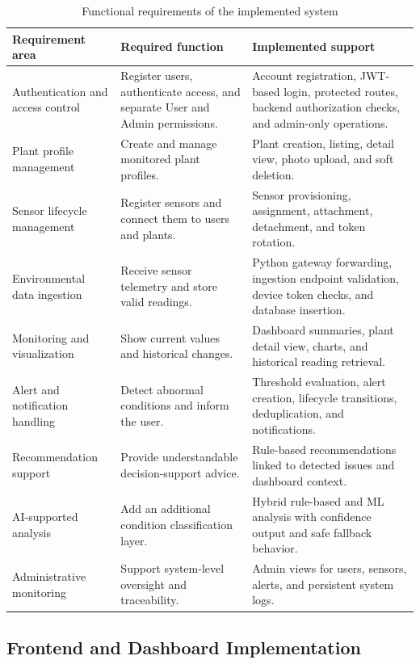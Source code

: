 \begin{table}[H]
\centering
\caption{Functional requirements of the implemented system}
\label{tab:functional-requirements}
\begin{tabular}{p{}p{}p{}}
\hline
\textbf{Requirement area} & \textbf{Required function} & \textbf{Implemented support} \\
\hline
Authentication and access control & Register users, authenticate access, and separate User and Admin permissions. & Account registration, JWT-based login, protected routes, backend authorization checks, and admin-only operations. \\
Plant profile management & Create and manage monitored plant profiles. & Plant creation, listing, detail view, photo upload, and soft deletion. \\
Sensor lifecycle management & Register sensors and connect them to users and plants. & Sensor provisioning, assignment, attachment, detachment, and token rotation. \\
Environmental data ingestion & Receive sensor telemetry and store valid readings. & Python gateway forwarding, ingestion endpoint validation, device token checks, and database insertion. \\
Monitoring and visualization & Show current values and historical changes. & Dashboard summaries, plant detail view, charts, and historical reading retrieval. \\
Alert and notification handling & Detect abnormal conditions and inform the user. & Threshold evaluation, alert creation, lifecycle transitions, deduplication, and notifications. \\
Recommendation support & Provide understandable decision-support advice. & Rule-based recommendations linked to detected issues and dashboard context. \\
AI-supported analysis & Add an additional condition classification layer. & Hybrid rule-based and ML analysis with confidence output and safe fallback behavior. \\
Administrative monitoring & Support system-level oversight and traceability. & Admin views for users, sensors, alerts, and persistent system logs. \\
\hline
\end{tabular}
\end{table}

\subsection{Frontend and Dashboard Implementation}
\label{subsec:frontend-dashboard-implementation}

